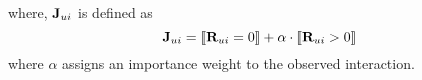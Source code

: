 


%

where, $\mathbf{J}_{ui}$ is defined as
\begin{equation}
\label{eqn:wrmf-weight}
\mathbf{J}_{ui} =  \llbracket  \mathbf{R}_{ui} = 0  \rrbracket + \alpha \cdot \llbracket  \mathbf{R}_{ui} > 0  \rrbracket 
\end{equation}
where $\alpha$ assigns an importance weight to the observed interaction. 


